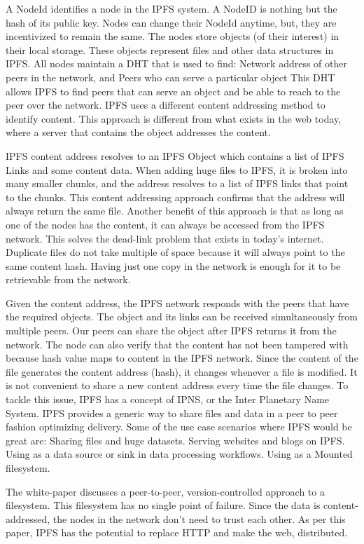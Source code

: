 	      A NodeId identifies a node in the IPFS system. A NodeID is nothing but the hash of its public key. Nodes can change their NodeId anytime, but, they are incentivized to remain the same. The nodes store objects (of their interest) in their local storage. These objects represent files and other data structures in IPFS.
	      All nodes maintain a DHT that is used to find:
	      Network address of other peers in the network, and 
	      Peers who can serve a particular object
	      This DHT allows IPFS to find peers that can serve an object and be able to reach to the peer over the network.
	      IPFS uses a different content addressing method to identify content. This approach is different from what exists in the web today, where a server that contains the object addresses the content.
	      
	      IPFS content address resolves to an IPFS Object which contains a list of IPFS Links and some content data. When adding huge files to IPFS, it is broken into many smaller chunks, and the address resolves to a list of IPFS links that point to the chunks. This content addressing approach confirms that the address will always return the same file.
	      Another benefit of this approach is that as long as one of the nodes has the content, it can always be accessed from the IPFS network. This solves the dead-link problem that exists in today’s internet. Duplicate files do not take multiple of space because it will always point to the same content hash. Having just one copy in the network is enough for it to be retrievable from the network.
	      
	      Given the content address, the IPFS network responds with the peers that have the required objects. The object and its links can be received simultaneously from multiple peers.
	      Our peers can share the object after IPFS returns it from the network. The node can also verify that the content has not been tampered with because hash value maps to content in the IPFS network. Since the content of the file generates the content address (hash), it changes whenever a file is modified.
	      It is not convenient to share a new content address every time the file changes. To tackle this issue, IPFS has a concept of IPNS, or the Inter Planetary Name System.
	      IPFS provides a generic way to share files and data in a peer to peer fashion optimizing delivery. Some of the use case scenarios where IPFS would be great are:
	      Sharing files and huge datasets.
	      Serving websites and blogs on IPFS.
	      Using as a data source or sink in data processing workflows.
	      Using as a Mounted filesystem.
	      
	      The white-paper discusses a peer-to-peer, version-controlled approach to a filesystem. This filesystem has no single point of failure. Since the data is content-addressed, the nodes in the network don’t need to trust each other. As per this paper, IPFS has the potential to replace HTTP and make the web, distributed.
	    
